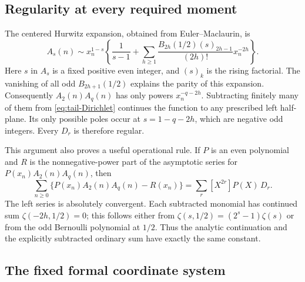 \documentclass[11pt,a4paper]{article}
\numberwithin{equation}{section}
\theoremstyle{plain}
\theoremstyle{definition}
\theoremstyle{remark}
\begin{document}
\subsection{Regularity at every required moment}

The centered Hurwitz expansion, obtained from Euler--Maclaurin, is
\begin{equation}\label{eq:centered-hurwitz-foundation}
 A_s(n)\sim x_n^{1-s}\left\{
 \frac1{s-1}+\sum_{h\ge1}
    \frac{B_{2h}(1/2)(s)_{2h-1}}{(2h)!}x_n^{-2h}\right\}.
\end{equation}
Here $s$ in $A_s$ is a fixed positive even integer, and
$(s)_k$ is the rising factorial. The vanishing of all odd
$B_{2h+1}(1/2)$ explains the parity of this expansion.
Consequently $A_2(n)A_q(n)$ has only powers $x_n^{-q-2h}$.
Subtracting finitely many of them from \eqref{eq:tail-Dirichlet}
continues the function to any prescribed left half-plane. Its only
possible poles occur at $s=1-q-2h$, which are negative odd integers.
Every $D_r$ is therefore regular.

This argument also proves a useful operational rule. If $P$ is an
even polynomial and $R$ is the nonnegative-power part of the
asymptotic series for $P(x_n)A_2(n)A_q(n)$, then
\begin{equation}\label{eq:ordinary-fp-foundation}
 \sum_{n\ge0}\{P(x_n)A_2(n)A_q(n)-R(x_n)\}
 =\sum_r [X^{2r}]P(X)\,D_r.
\end{equation}
The left series is absolutely convergent. Each subtracted monomial
has continued sum $\zeta(-2h,1/2)=0$; this follows either from
$\zeta(s,1/2)=(2^s-1)\zeta(s)$ or from the odd Bernoulli polynomial
at $1/2$. Thus the analytic continuation and the explicitly subtracted
ordinary sum have exactly the same constant.

\subsection{The fixed formal coordinate system}
\end{document}
